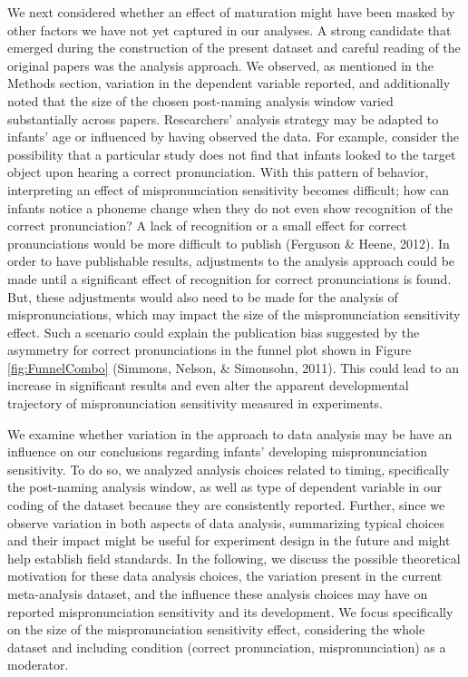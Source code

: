 \documentclass[
  english,
  man, noextraspace]{apa6}
\begin{document}
We next considered whether an effect of maturation might have been masked by other factors we have not yet captured in our analyses. A strong candidate that emerged during the construction of the present dataset and careful reading of the original papers was the analysis approach. We observed, as mentioned in the Methods section, variation in the dependent variable reported, and additionally noted that the size of the chosen post-naming analysis window varied substantially across papers. Researchers' analysis strategy may be adapted to infants' age or influenced by having observed the data. For example, consider the possibility that a particular study does not find that infants looked to the target object upon hearing a correct pronunciation. With this pattern of behavior, interpreting an effect of mispronunciation sensitivity becomes difficult; how can infants notice a phoneme change when they do not even show recognition of the correct pronunciation? A lack of recognition or a small effect for correct pronunciations would be more difficult to publish (Ferguson \& Heene, 2012). In order to have publishable results, adjustments to the analysis approach could be made until a significant effect of recognition for correct pronunciations is found. But, these adjustments would also need to be made for the analysis of mispronunciations, which may impact the size of the mispronunciation sensitivity effect. Such a scenario could explain the publication bias suggested by the asymmetry for correct pronunciations in the funnel plot shown in Figure \ref{fig:FunnelCombo} (Simmons, Nelson, \& Simonsohn, 2011). This could lead to an increase in significant results and even alter the apparent developmental trajectory of mispronunciation sensitivity measured in experiments.

We examine whether variation in the approach to data analysis may be have an influence on our conclusions regarding infants' developing mispronunciation sensitivity. To do so, we analyzed analysis choices related to timing, specifically the post-naming analysis window, as well as type of dependent variable in our coding of the dataset because they are consistently reported. Further, since we observe variation in both aspects of data analysis, summarizing typical choices and their impact might be useful for experiment design in the future and might help establish field standards. In the following, we discuss the possible theoretical motivation for these data analysis choices, the variation present in the current meta-analysis dataset, and the influence these analysis choices may have on reported mispronunciation sensitivity and its development. We focus specifically on the size of the mispronunciation sensitivity effect, considering the whole dataset and including condition (correct pronunciation, mispronunciation) as a moderator.
\end{document}

